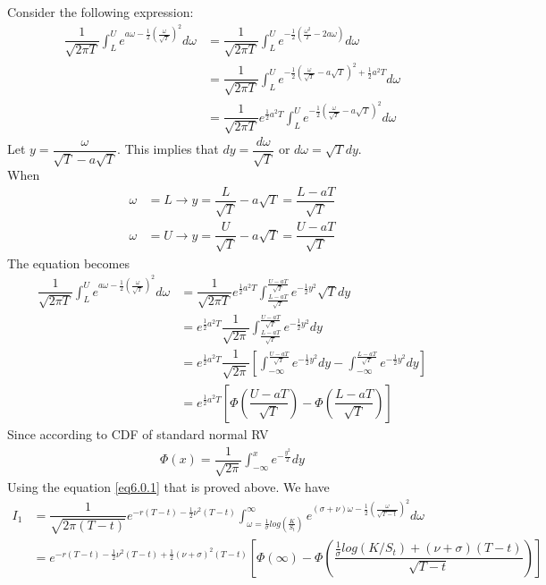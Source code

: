 Consider the following expression:
\begin{align}
	\dfrac{1}{\sqrt{2\pi T}}\displaystyle \int_{L}^{U}e^{a\omega-\frac{1}{2}(\frac{\omega}{\sqrt{T}})^2}d\omega&=\dfrac{1}{\sqrt{2\pi T}}\displaystyle \int_{L}^{U}e^{-\frac{1}{2}(\frac{\omega^2}{T}-2a\omega)}d\omega \nonumber\\
	&=\dfrac{1}{\sqrt{2\pi T}}\displaystyle \int_{L}^{U}e^{-\frac{1}{2}\left(\frac{\omega}{\sqrt{T}}-a\sqrt{T}\right)^2+\frac{1}{2}a^2T}d\omega \nonumber\\
	&=\dfrac{1}{\sqrt{2\pi T}}e^{\frac{1}{2}a^2T}\displaystyle \int_{L}^{U}e^{-\frac{1}{2}\left(\frac{\omega}{\sqrt{T}}-a\sqrt{T}\right)^2}d\omega \label{eq6.0.2}
\end{align}
Let $y=\dfrac{\omega}{\sqrt{T}-a\sqrt{T}}$. This implies that $dy=\dfrac{d\omega}{\sqrt{T}}$ or $d\omega=\sqrt{T}dy$.\\ When
\begin{align*}
\omega&=L \rightarrow y=\dfrac{L}{\sqrt{T}}-a\sqrt{T}=\dfrac{L-aT}{\sqrt{T}}\\
\omega&=U \rightarrow y=\dfrac{U}{\sqrt{T}}-a\sqrt{T}=\dfrac{U-aT}{\sqrt{T}}
\end{align*}
The equation  becomes
\begin{align*}
	\dfrac{1}{\sqrt{2\pi T}}\displaystyle \int_{L}^{U}e^{a\omega-\frac{1}{2}(\frac{\omega}{\sqrt{T}})^2}d\omega&=\dfrac{1}{\sqrt{2\pi T}}e^{\frac{1}{2}a^2T}\displaystyle \int_{\frac{L-aT}{\sqrt{T}}}^{\frac{U-aT}{\sqrt{T}}}e^{-\frac{1}{2}y^2}\sqrt{T}dy\\
	&=e^{\frac{1}{2}a^2T}\dfrac{1}{\sqrt{2\pi }}\displaystyle \int_{\frac{L-aT}{\sqrt{T}}}^{\frac{U-aT}{\sqrt{T}}}e^{-\frac{1}{2}y^2}dy\\
	&=e^{\frac{1}{2}a^2T}\dfrac{1}{\sqrt{2\pi }}\left[\displaystyle \int_{-\infty}^{\frac{U-aT}{\sqrt{T}}}e^{-\frac{1}{2}y^2}dy-\displaystyle \int_{-\infty}^{\frac{L-aT}{\sqrt{T}}}e^{-\frac{1}{2}y^2}dy\right]\\
	&=e^{\frac{1}{2}a^2T}\left[\Phi\left(\dfrac{U-aT}{\sqrt{T}}\right)-\Phi\left(\dfrac{L-aT}{\sqrt{T}}\right)\right]
\end{align*}
Since according to CDF of standard normal RV 
\begin{align*}
	\Phi(x)=\dfrac{1}{\sqrt{2\pi}}\displaystyle \int_{-\infty}^{x}e^{-\frac{y^2}{2}}dy
\end{align*}
Using the equation \eqref{eq6.0.1} that is proved above. We have
\begin{align*}
	I_1&=\dfrac{1}{\sqrt{2\pi (T-t)}}e^{-r(T-t)-\frac{1}{2}\nu^2(T-t)}\displaystyle \int_{\omega =\frac{1}{\sigma}log\left(\frac{K}{S_t}\right) }^{\infty}e^{(\sigma+ \nu)\omega-\frac{1}{2}\left(\frac{\omega}{\sqrt{T-t}}\right)^2}d\omega\\
	&=e^{-r(T-t)-\frac{1}{2}\nu^2(T-t)+\frac{1}{2}(\nu+\sigma)^2(T-t)}\left[\Phi(\infty)-\Phi\left(\dfrac{\frac{1}{\sigma}log(K/S_t)+(\nu +\sigma)(T-t)}{\sqrt{T-t}}\right)\right]
\end{align*}
